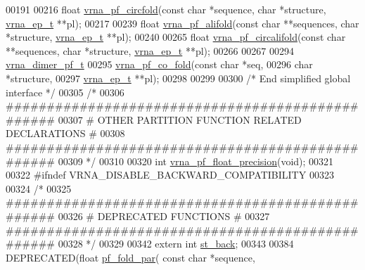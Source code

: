 \begin{DoxyCode}
00191 
00216 \textcolor{keywordtype}{float} \hyperlink{group__part__func__global_ga87e5a77b6e50dd54e9d032a9b92973be}{vrna\_pf\_circfold}(\textcolor{keyword}{const} \textcolor{keywordtype}{char} *sequence, \textcolor{keywordtype}{char} *structure, 
      \hyperlink{group__struct__utils__plist_structvrna__elem__prob__s}{vrna\_ep\_t} **pl);
00217 
00239 \textcolor{keywordtype}{float} \hyperlink{group__part__func__global_ga374e31a0f326b2c5da5b84e143a63f38}{vrna\_pf\_alifold}(\textcolor{keyword}{const} \textcolor{keywordtype}{char} **sequences, \textcolor{keywordtype}{char} *structure, 
      \hyperlink{group__struct__utils__plist_structvrna__elem__prob__s}{vrna\_ep\_t} **pl);
00240 
00265 \textcolor{keywordtype}{float} \hyperlink{group__part__func__global_gab70fe6c9a78b79cc5669881720926e1d}{vrna\_pf\_circalifold}(\textcolor{keyword}{const} \textcolor{keywordtype}{char} **sequences, \textcolor{keywordtype}{char} *structure, 
      \hyperlink{group__struct__utils__plist_structvrna__elem__prob__s}{vrna\_ep\_t} **pl);
00266 
00267 
00294 \hyperlink{group__part__func__global_structvrna__dimer__pf__s}{vrna\_dimer\_pf\_t}
00295 \hyperlink{group__part__func__global_gaf2b846f7ac382686f35ff7b9202fdd5c}{vrna\_pf\_co\_fold}(\textcolor{keyword}{const} \textcolor{keywordtype}{char}  *seq,
00296                 \textcolor{keywordtype}{char}        *structure,
00297                 \hyperlink{group__struct__utils__plist_structvrna__elem__prob__s}{vrna\_ep\_t}   **pl);
00298 
00299 
00300 \textcolor{comment}{/* End simplified global interface */}
00305 \textcolor{comment}{/*}
00306 \textcolor{comment}{#################################################}
00307 \textcolor{comment}{# OTHER PARTITION FUNCTION RELATED DECLARATIONS #}
00308 \textcolor{comment}{#################################################}
00309 \textcolor{comment}{*/}
00310 
00320 \textcolor{keywordtype}{int} \hyperlink{group__pf__fold_gad2b3594f0b50b68029e0f54fdce59313}{vrna\_pf\_float\_precision}(\textcolor{keywordtype}{void});
00321 
00322 \textcolor{preprocessor}{#ifndef VRNA\_DISABLE\_BACKWARD\_COMPATIBILITY}
00323 
00324 \textcolor{comment}{/*}
00325 \textcolor{comment}{#################################################}
00326 \textcolor{comment}{# DEPRECATED FUNCTIONS                          #}
00327 \textcolor{comment}{#################################################}
00328 \textcolor{comment}{*/}
00329 
00342 \textcolor{keyword}{extern}  \textcolor{keywordtype}{int} \hyperlink{group__subopt__stochbt_gacd79b1a570e6ad9be24cb11fe8cae30a}{st\_back};
00343 
00384 DEPRECATED(\textcolor{keywordtype}{float}   \hyperlink{group__part__func__global__deprecated_gac4f95bee734b2563a3d6e9932117ebdf}{pf\_fold\_par}(  \textcolor{keyword}{const} \textcolor{keywordtype}{char} *sequence,

\end{DoxyCode}
